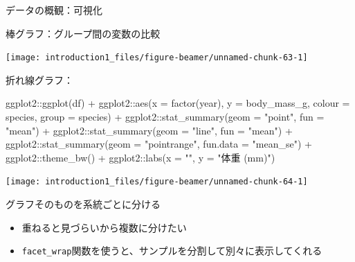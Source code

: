 \documentclass[
  ignorenonframetext,
]{beamer}
\newenvironment{Shaded}{\begin{snugshade}}{\end{snugshade}}
\newcommand{\AttributeTok}[1]{\textcolor[rgb]{0.77,0.63,0.00}{#1}}
\newcommand{\FunctionTok}[1]{\textcolor[rgb]{0.00,0.00,0.00}{#1}}
\newcommand{\NormalTok}[1]{#1}
\newcommand{\SpecialCharTok}[1]{\textcolor[rgb]{0.00,0.00,0.00}{#1}}
\newcommand{\StringTok}[1]{\textcolor[rgb]{0.31,0.60,0.02}{#1}}
\providecommand{\tightlist}{%
  \setlength{\itemsep}{0pt}\setlength{\parskip}{0pt}}
\begin{document}
\begin{frame}[fragile]{データの概観：可視化}
\begin{block}{棒グラフ：グループ間の変数の比較}
\begin{center}\texttt{[image: introduction1\_files/figure-beamer/unnamed-chunk-63-1]} \end{center}
\end{block}

\begin{block}{折れ線グラフ：}
\protect\hypertarget{ux6298ux308cux7ddaux30b0ux30e9ux30d5}{}
\begin{Shaded}
\begin{Highlighting}[]
\NormalTok{ggplot2}\SpecialCharTok{::}\FunctionTok{ggplot}\NormalTok{(df) }\SpecialCharTok{+}
\NormalTok{  ggplot2}\SpecialCharTok{::}\FunctionTok{aes}\NormalTok{(}\AttributeTok{x =} \FunctionTok{factor}\NormalTok{(year), }\AttributeTok{y =}\NormalTok{ body\_mass\_g, }\AttributeTok{colour =}\NormalTok{ species, }\AttributeTok{group =}\NormalTok{ species) }\SpecialCharTok{+}
\NormalTok{  ggplot2}\SpecialCharTok{::}\FunctionTok{stat\_summary}\NormalTok{(}\AttributeTok{geom =} \StringTok{"point"}\NormalTok{, }\AttributeTok{fun =} \StringTok{"mean"}\NormalTok{) }\SpecialCharTok{+}
\NormalTok{  ggplot2}\SpecialCharTok{::}\FunctionTok{stat\_summary}\NormalTok{(}\AttributeTok{geom =} \StringTok{"line"}\NormalTok{, }\AttributeTok{fun =} \StringTok{"mean"}\NormalTok{) }\SpecialCharTok{+}
\NormalTok{  ggplot2}\SpecialCharTok{::}\FunctionTok{stat\_summary}\NormalTok{(}\AttributeTok{geom =} \StringTok{"pointrange"}\NormalTok{, }\AttributeTok{fun.data =} \StringTok{"mean\_se"}\NormalTok{) }\SpecialCharTok{+}
\NormalTok{  ggplot2}\SpecialCharTok{::}\FunctionTok{theme\_bw}\NormalTok{() }\SpecialCharTok{+}
\NormalTok{  ggplot2}\SpecialCharTok{::}\FunctionTok{labs}\NormalTok{(}\AttributeTok{x =} \StringTok{""}\NormalTok{, }\AttributeTok{y =} \StringTok{"体重 (mm)"}\NormalTok{)}
\end{Highlighting}
\end{Shaded}

\begin{center}\texttt{[image: introduction1\_files/figure-beamer/unnamed-chunk-64-1]} \end{center}
\end{block}

\begin{block}{グラフそのものを系統ごとに分ける}
\protect\hypertarget{ux30b0ux30e9ux30d5ux305dux306eux3082ux306eux3092ux7cfbux7d71ux3054ux3068ux306bux5206ux3051ux308b}{}
\begin{itemize}
\tightlist
\item
  重ねると見づらいから複数に分けたい
\item
  \texttt{facet\_wrap}関数を使うと、サンプルを分割して別々に表示してくれる


\end{itemize}
\end{block}
\end{frame}
\end{document}
